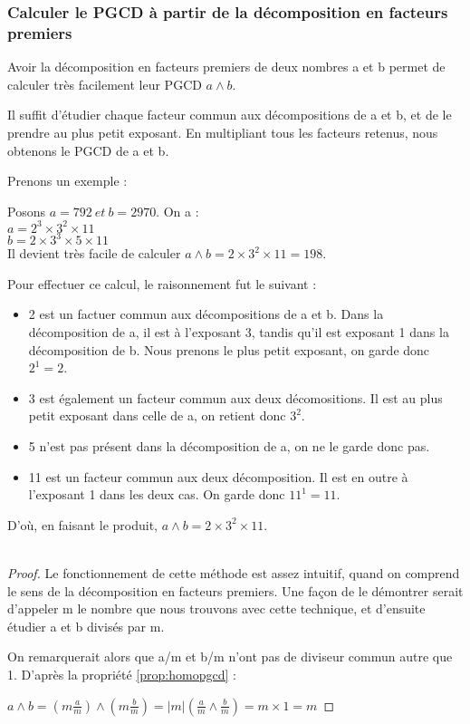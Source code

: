 \subsubsection{Calculer le PGCD à partir de la décomposition en facteurs premiers}
\label{part:pgcd_decompo}

Avoir la décomposition en facteurs premiers de deux nombres a et b permet de calculer très facilement leur PGCD $a \wedge b$.

Il suffit d'étudier chaque facteur commun aux décompositions de a et b, et de le prendre au plus petit exposant. En multipliant tous les facteurs retenus, nous obtenons le PGCD de a et b.

Prenons un exemple :

\begin{example}

Posons $a = 792 \ et \ b = 2970$. On a :\\
$a = 2^3 \times 3^2 \times 11$\\
$b = 2 \times 3^3 \times 5 \times 11$\\
Il devient très facile de calculer $a \wedge b = 2 \times 3^2 \times 11 = 198$.

\end{example}

Pour effectuer ce calcul, le raisonnement fut le suivant :

\begin{itemize}
    \item 2 est un factuer commun aux décompositions de a et b. Dans la décomposition de a, il est à l'exposant 3, tandis qu'il est exposant 1 dans la décomposition de b. Nous prenons le plus petit exposant, on garde donc $2^1 = 2$.
    \item 3 est également un facteur commun aux deux décomositions. Il est au plus petit exposant dans celle de a, on retient donc $3^2$.
    \item 5 n'est pas présent dans la décomposition de a, on ne le garde donc pas.
    \item 11 est un facteur commun aux deux décomposition. Il est en outre à l'exposant 1 dans les deux cas. On garde donc $11^1 = 11$.
\end{itemize}

D'où, en faisant le produit, $a \wedge b = 2 \times 3^2 \times 11$.\\
\\

\begin{proof}
Le fonctionnement de cette méthode est assez intuitif, quand on comprend le sens de la décomposition en facteurs premiers. Une façon de le démontrer serait d'appeler m le nombre que nous trouvons avec cette technique, et d'ensuite étudier a et b divisés par m.

On remarquerait alors que a/m et b/m n'ont pas de diviseur commun autre que 1.
D'après la propriété \ref{prop:homopgcd} :

$a \wedge b = (m \frac{a}{m}) \wedge (m \frac{b}{m}) = |m|(\frac{a}{m} \wedge \frac{b}{m}) = m \times 1 = m$
\end{proof}

